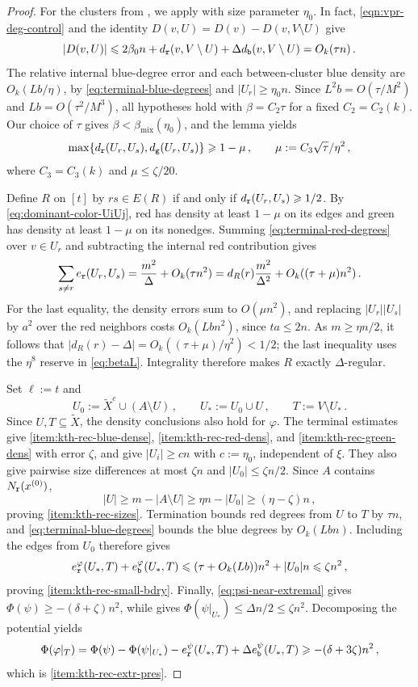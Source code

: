 \begin{proof}
For the clusters from , we apply  with size parameter $\eta_0$. In fact, \eqref{eqn:vpr-deg-control} and the identity $D(v,U)=D(v)-D(v,V\setminus U)$ give
$$|D(v,U)|\leqslant2\beta_0n+d_{\normalfont\texttt r}(v,V\setminus U)+\Delta d_{\normalfont\texttt b}(v,V\setminus U)=O_k(\tau n)\,.$$
The relative internal blue-degree error and each between-cluster blue density are $O_k(Lb/\eta)$, by \eqref{eq:terminal-blue-degrees} and $|U_r|\geq\eta_0n$. Since $L^2b=O(\tau/M^2)$ and $Lb=O(\tau^2/M^3)$, all hypotheses hold with $\beta=C_2\tau$ for a fixed $C_2=C_2(k)$. Our choice of $\tau$ gives $\beta<\beta_{\mathrm{mix}}(\eta_0)$, and the lemma yields
\begin{equation}\label{eq:dominant-color-UiUj}
\max\{d_{\normalfont\texttt r}(U_r,U_s),d_{\normalfont\texttt g}(U_r,U_s)\}\geqslant1-\mu\,,\qquad \mu:=C_3\sqrt\tau/\eta^2\,,
\end{equation}
where $C_3=C_3(k)$ and $\mu\leq\zeta/20$.

Define $R$ on $[t]$ by $rs\in E(R)$ if and only if $d_{\normalfont\texttt r}(U_r,U_s)\geqslant1/2$. By \eqref{eq:dominant-color-UiUj}, red has density at least $1-\mu$ on its edges and green has density at least $1-\mu$ on its nonedges. Summing \eqref{eq:terminal-red-degrees} over $v\in U_r$ and subtracting the internal red contribution gives
\begin{equation}\label{eqn:erurus-rhs}
\sum_{s\neq r}e_{\normalfont\texttt r}(U_r,U_s)=\frac{m^2}{\Delta}+O_k(\tau n^2)=d_R(r)\frac{m^2}{\Delta^2}+O_k((\tau+\mu)n^2)\,.
\end{equation}
For the last equality, the density errors sum to $O(\mu n^2)$, and replacing $|U_r||U_s|$ by $a^2$ over the red neighbors costs $O_k(Lbn^2)$, since $ta\leq2n$. As $m\geq\eta n/2$, it follows that $|d_R(r)-\Delta|=O_k((\tau+\mu)/\eta^2)<1/2$; the last inequality uses the $\eta^8$ reserve in \eqref{eq:betaL}. Integrality therefore makes $R$ exactly $\Delta$-regular.

Set $\ell:=t$ and
$$U_0:=\widetilde X^c\cup(A\setminus U)\,,\qquad U_\ast:=U_0\cup U\,,\qquad T:=V\setminus U_\ast\,.$$
Since $U,T\subseteq\widetilde X$, the density conclusions also hold for $\varphi$. The terminal estimates give \ref{item:kth-rec-blue-dense}, \ref{item:kth-rec-red-dens}, and \ref{item:kth-rec-green-dens} with error $\zeta$, and give $|U_i|\geq cn$ with $c:=\eta_0$, independent of $\xi$. They also give pairwise size differences at most $\zeta n$ and $|U_0|\leq\zeta n/2$. Since $A$ contains $N_{\normalfont\texttt r}(x^{(0)})$,
$$|U|\geq m-|A\setminus U|\geq\eta n-|U_0|\geq(\eta-\zeta)n\,,$$
proving \ref{item:kth-rec-sizes}. Termination bounds red degrees from $U$ to $T$ by $\tau n$, and \eqref{eq:terminal-blue-degrees} bounds the blue degrees by $O_k(Lbn)$. Including the edges from $U_0$ therefore gives
$$e_{\normalfont\texttt r}^\varphi(U_\ast,T)+e_{\normalfont\texttt b}^\varphi(U_\ast,T)\leqslant(\tau+O_k(Lb))n^2+|U_0|n\leqslant\zeta n^2\,,$$
proving \ref{item:kth-rec-small-bdry}. Finally, \eqref{eq:psi-near-extremal} gives $\Phi(\psi)\geq-(\delta+\zeta)n^2$, while  gives $\Phi(\psi|_{U_\ast})\leq\Delta n/2\leq\zeta n^2$. Decomposing the potential yields
$$\Phi(\varphi|_T)=\Phi(\psi)-\Phi(\psi|_{U_\ast})-e_{\normalfont\texttt r}^\psi(U_\ast,T)+\Delta e_{\normalfont\texttt b}^\psi(U_\ast,T)\geqslant-(\delta+3\zeta)n^2\,,$$
which is \ref{item:kth-rec-extr-pres}.
\end{proof}

